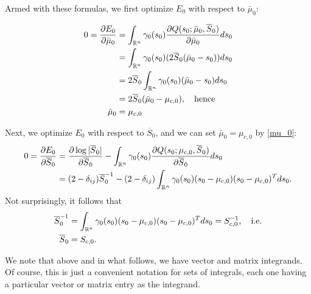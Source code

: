 \documentclass[12pt,leqno]{article}
\begin{document}
Armed with these formulas, we first optimize $E_0$ with respect to $\bar{\mu}_0$: 
 
\begin{align}
0 = \frac{\partial{E_0}}{\partial{\bar{\mu}_0}} &= \int_{{\mathbb R}^n}\gamma_0(s_0)\frac{\partial{Q(s_0;\bar{\mu}_0,\overline{S}_0)}}{\partial{\bar{\mu}_0}}ds_0 \notag\\
&= \int_{{\mathbb R}^n}\gamma_0(s_0)(2\overline{S}_0(\bar{\mu}_0-s_0))ds_0\notag\\
&= 2\overline{S}_0\int_{{\mathbb R}^n}\gamma_0(s_0)(\bar{\mu}_0-s_0)ds_0 \notag\\
&= 2\overline{S}_0(\bar{\mu}_0-\mu_{c,0}), \quad\text{hence}\notag\\
\bar{\mu}_0 &= \mu_{c,0}\label{mu_0}
\end{align}

Next, we optimize $E_0$ with respect to $\overline{S}_0$, and we can set $\bar{\mu}_0 = \mu_{c,0}$ by \eqref{mu_0}:
\begin{align*}
  0 = \frac{\partial{E_0}}{\partial{\overline{S}_0}} &= \frac{\partial\log|\overline{S}_0|}{\partial\overline{S}_0}
  -\int_{{\mathbb R}^n}\gamma_0(s_0)\frac{\partial{Q(s_0;\mu_{c,0},\overline{S}_0)}}{\partial\overline{S}_0}ds_0 \\
&= (2-\delta_{ij})\overline{S}_0^{-1} - (2-\delta_{ij})\int_{{\mathbb R}^n}\gamma_0(s_0)(s_0-\mu_{c,0})(s_0-\mu_{c,0})^Tds_0.
\end{align*}
Not surprisingly, it follows that
\begin{equation}\label{Sigma_0}
  \begin{split}
    \overline{S}_0^{-1} &= \int_{{\mathbb R}^n}\gamma_0(s_0)(s_0-\mu_{c,0})(s_0-\mu_{c,0})^Tds_0 = S_{c,0}^{-1}, \quad\text{i.e.}\\
    \overline{S}_0 &= S_{c,0}.
  \end{split}
\end{equation}

We note that above and in what follows, we have vector and matrix integrands.  Of course, this is just a convenient
notation for sets of integrals, each one having a particular vector or matrix entry as the integrand.
\end{document}
